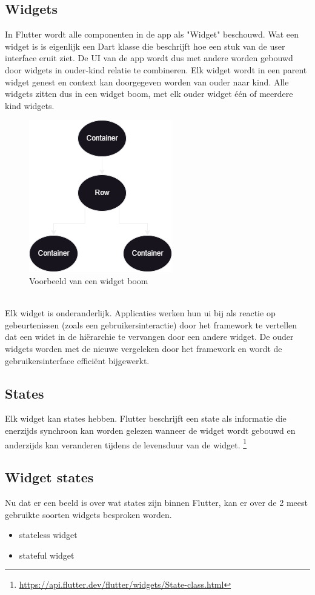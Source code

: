 \subsection[widget]{Widgets}
\label{sec:Widgets}
In Flutter wordt alle componenten in de app als "Widget" beschouwd. Wat een widget is is eigenlijk een Dart klasse die beschrijft hoe een stuk van de user interface eruit ziet.
De UI van de app wordt dus met andere worden gebouwd door widgets in ouder-kind relatie te combineren. Elk widget wordt in een parent widget genest en context kan doorgegeven worden van ouder naar kind.
Alle widgets zitten dus in een widget boom, met elk ouder widget één of meerdere kind widgets.
\\
\begin{figure}[h]
    \includegraphics{graphics/widgetTree.png}
    \caption{Voorbeeld van een widget boom}
\end{figure}
\\
Elk widget is onderanderlijk. Applicaties werken hun ui bij als reactie op gebeurtenissen (zoals een gebruikersinteractie) door het framework te vertellen 
dat een widet in de hiërarchie te vervangen door een andere widget. De ouder widgets worden met de nieuwe vergeleken door het framework en wordt de 
gebruikersinterface efficiënt bijgewerkt.


\subsection[states]{States}
\label{sec:States}
Elk widget kan states hebben. Flutter beschrijft een state als informatie die enerzijds synchroon kan worden gelezen wanneer de widget wordt gebouwd en anderzijds
kan veranderen tijdens de levensduur van de widget.  \footnote{\url{https://api.flutter.dev/flutter/widgets/State-class.html}}


\subsection[widget states]{Widget states}
\label{sec:Widget states}
Nu dat er een beeld is over wat states zijn binnen Flutter, kan er over de 2 meest gebruikte soorten widgets besproken worden. 
 \begin{itemize}
     \item stateless widget
     \item stateful widget
 \end{itemize}


